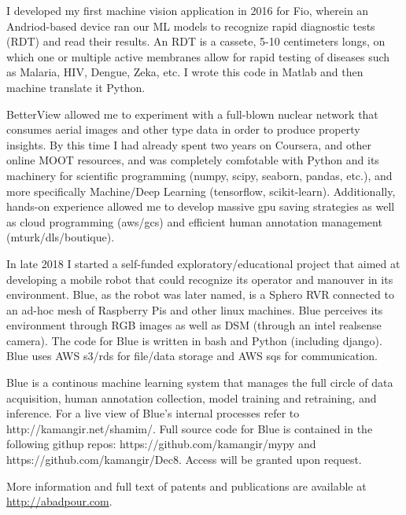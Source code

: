 I developed my first machine vision application in 2016 for Fio, wherein an Andriod-based device ran our ML models to recognize 
rapid diagnostic tests (RDT) and read their results. An RDT is a cassete, 5-10 centimeters longs, on which one or multiple active
membranes allow for rapid testing of diseases such as Malaria, HIV, Dengue, Zeka, etc. I wrote this code in Matlab and then machine 
translate it Python. 

BetterView allowed me to experiment with a full-blown nuclear network that consumes aerial images and other type data in order to 
produce property insights. By this time I had already spent two years on Coursera, and other online MOOT resources, and was completely 
comfotable with Python and its machinery for scientific programming (numpy, scipy, seaborn, pandas, etc.), and more specifically 
Machine/Deep Learning (tensorflow, scikit-learn). Additionally, hands-on experience allowed me to develop massive gpu saving strategies 
as well as cloud programming (aws/gcs) and efficient human annotation management (mturk/dls/boutique).

In late 2018 I started a self-funded exploratory/educational project that aimed at developing a mobile robot that could recognize its
operator and manouver in its environment. Blue, as the robot was later named, is a Sphero RVR connected to an ad-hoc mesh of Raspberry 
Pis and other linux machines. Blue perceives its environment through RGB images as well as DSM (through an intel realsense camera). The 
code for Blue is written in bash and Python (including django). Blue uses AWS s3/rds for file/data storage and AWS sqs for communication. 

Blue is a continous machine learning system that manages the full circle of data acquisition, human annotation collection, model training and
retraining, and inference. For a live view of Blue's internal processes refer to http://kamangir.net/shamim/. Full source code for Blue is 
contained in the following githup repos: https://github.com/kamangir/mypy and https://github.com/kamangir/Dec8. Access will be granted upon 
request. 


\vspace{0.5cm}
More information and full text of patents and publications are available at \url{http://abadpour.com}.

\vspace{1.5cm}
